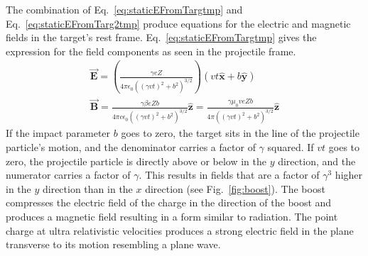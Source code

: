    The combination of Eq.~\ref{eq:staticEFromTargtmp} and 
      Eq.~\ref{eq:staticEFromTarg2tmp} produce equations for the electric and 
      magnetic fields in the target's rest frame. 
    Eq.~\ref{eq:staticEFromTargtmp} gives the expression for the field 
      components as seen in the projectile frame. 
    \begin{eqnarray} 
	\vec{\mathbf{E}}=\left( \frac{\gamma e Z}
         { 4 \pi \epsilon_{0} \left( \left( \gamma v t \right)^{2} 
	 + b^{2}\right)^{3/2} }\right)
         \left(vt\mathbf{\hat{x}}+b\mathbf{\hat{y}}\right)\qquad\nonumber \\
	 \vec{\mathbf{B}}=\frac{\gamma\beta e Z b}
	 { 4 \pi c \epsilon_{0} \left( \left( \gamma v t \right)^{2} 
	 + b^{2}\right)^{3/2} }
         \mathbf{\hat{z}}=
	 \frac{\gamma\mu_{0}veZb}{4\pi\left(\left(\gamma v t \right)^{2}
	 +b^{2}\right)^{3/2}}\mathbf{\hat{z}}
    \end{eqnarray}
    If the impact parameter $b$ goes to zero, the target sits in the line of 
      the projectile particle's motion, and the denominator carries a factor of
      $\gamma$ squared. 
    If $vt$ goes to zero, the projectile particle is directly above or below in
      the $y$ direction, and the numerator carries a factor of $\gamma$. 
    This results in fields that are a factor of $\gamma^3$ higher in the 
      $y$ direction than in the $x$ direction (see Fig.~\ref{fig:boost}).  
    The boost compresses the electric field of the charge 
      in the direction of the boost and produces a magnetic field 
      resulting in a form similar to radiation.
    The point charge at ultra relativistic velocities produces a strong 
      electric field in the plane transverse to its motion resembling a plane 
      wave.
         
